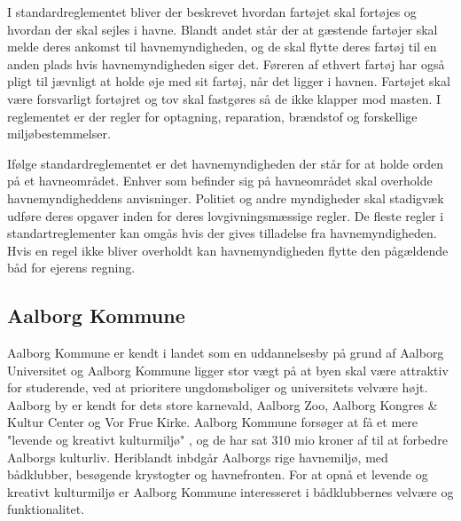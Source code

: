 I standardreglementet bliver der beskrevet hvordan fartøjet skal fortøjes og hvordan der skal sejles i havne. Blandt andet står der at gæstende fartøjer skal melde deres ankomst til havnemyndigheden, og de skal flytte deres fartøj til en anden plads hvis havnemyndigheden siger det. Føreren af ethvert fartøj har også pligt til jævnligt at holde øje med sit fartøj, når det ligger i havnen. Fartøjet skal være forsvarligt fortøjret og tov skal fastgøres så de ikke klapper mod masten. I reglementet er der regler for optagning, reparation, brændstof og forskellige miljøbestemmelser.

Ifølge standardreglementet er det havnemyndigheden der står for at holde orden på et havneområdet. Enhver som befinder sig på havneområdet skal overholde havnemyndigheddens anvisninger. Politiet og andre myndigheder skal stadigvæk udføre deres opgaver inden for deres lovgivningsmæssige regler. De fleste regler i standartreglementer kan omgås hvis der gives tilladelse fra havnemyndigheden. Hvis en regel ikke bliver overholdt kan havnemyndigheden flytte den pågældende båd for ejerens regning.


\subsection{Aalborg Kommune}
Aalborg Kommune er kendt i landet som en uddannelsesby på grund af Aalborg Universitet og Aalborg Kommune ligger stor vægt på at byen skal være attraktiv for studerende, ved at prioritere ungdomsboliger og universitets velvære højt. \cite{udd-strat-aalborg} Aalborg by er kendt for dets store karnevald, Aalborg Zoo, Aalborg Kongres \& Kultur Center og Vor Frue Kirke. \cite{AalborgAttraktioner} Aalborg Kommune forsøger at få et mere "levende og kreativt kulturmiljø" \cite{AalborgSatserPåKultur}, og de har sat 310 mio kroner af til at forbedre Aalborgs kulturliv. Heriblandt inbdgår Aalborgs rige havnemiljø, med bådklubber, besøgende krystogter og havnefronten. \cite{AalborgHavnefront} For at opnå et levende og kreativt kulturmiljø er Aalborg Kommune interesseret i bådklubbernes velvære og funktionalitet.

